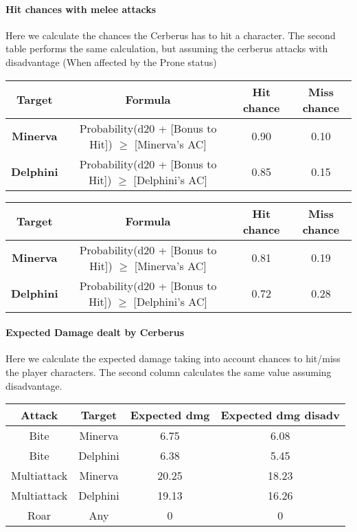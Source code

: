 \paragraph{Hit chances with melee attacks} Here we calculate the chances the Cerberus has to hit a character. The second table performs the same calculation, but assuming the cerberus attacks with disadvantage (When affected by the Prone status) \\

\begin{tabular}{cc|cc}
	\textbf{Target}   & \textbf{Formula} & \textbf{Hit chance} & \textbf{Miss chance} \\ \hline
	\textbf{Minerva}  &Probability(d20 + [Bonus to Hit]) $\geq$ [Minerva's AC]    & 0.90 & 0.10 \\ \hline
	\textbf{Delphini} &Probability(d20 + [Bonus to Hit]) $\geq$ [Delphini's AC]   & 0.85 & 0.15 \\ \hline
\end{tabular}

\begin{tabular}{cc|cc}
	\textbf{Target}   & \textbf{Formula} & \textbf{Hit chance} & \textbf{Miss chance} \\ \hline
	\textbf{Minerva}  &Probability(d20 + [Bonus to Hit]) $\geq$ [Minerva's AC]    & 0.81 & 0.19 \\ \hline
	\textbf{Delphini} &Probability(d20 + [Bonus to Hit]) $\geq$ [Delphini's AC]   & 0.72 & 0.28 \\ \hline
\end{tabular}

\paragraph{Expected Damage dealt by Cerberus} Here we calculate the expected damage taking into account chances to hit/miss the player characters. The second column calculates the same value assuming disadvantage.\\

\begin{tabular}{|cc|cc|}
	\textbf{Attack} & \textbf{Target} & \textbf{Expected dmg} & \textbf{Expected dmg disadv} \\ \hline
	Bite            & Minerva         &  6.75                 &  6.08                        \\
	Bite            & Delphini        &  6.38                 &  5.45                        \\
	Multiattack     & Minerva         & 20.25                 & 18.23                        \\
	Multiattack     & Delphini        & 19.13                 & 16.26                        \\
	Roar            & Any             &  0                    &  0                           \\ \hline
\end{tabular}\\


